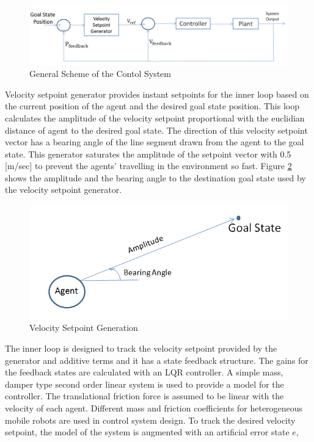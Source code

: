 \begin{figure}[H]
\caption{General Scheme of the Contol System} \label{Controller_ref}
\centering
\includegraphics[scale = 0.45]{controller}
\end{figure}

Velocity setpoint generator provides instant setpoints for the inner loop based on the current position of the agent and the desired goal state position.  This loop calculates the amplitude of the velocity setpoint proportional with the euclidian distance of agent to the desired goal state. The direction of this velocity setpoint vector has a bearing angle of the line segment drawn from the agent to the goal state. This generator saturates the amplitude of the setpoint vector with 0.5 [m/sec] to prevent the agents' travelling in the environment so fast. Figure \ref{velocity_sp_generation} shows the amplitude and the bearing angle to the destination goal state used by the velocity setpoint generator.

\begin{figure}[H]
\caption{Velocity Setpoint Generation} \label{velocity_sp_generation}
\centering
\includegraphics[scale = 0.50]{bearing}
\end{figure}

The inner loop is designed to track the velocity setpoint provided by the generator and additive terms and it has a state feedback structure. The gains for the feedback states are calculated with an LQR controller. A simple mass, damper type second order linear system is used to provide a model for the controller. The translational friction force is assumed to be linear with the velocity of each agent. Different mass and friction coefficients for heterogeneous mobile robots are used in control system design. To track the desired velocity setpoint, the model of the system is augmented with an artificial error state $e$,

